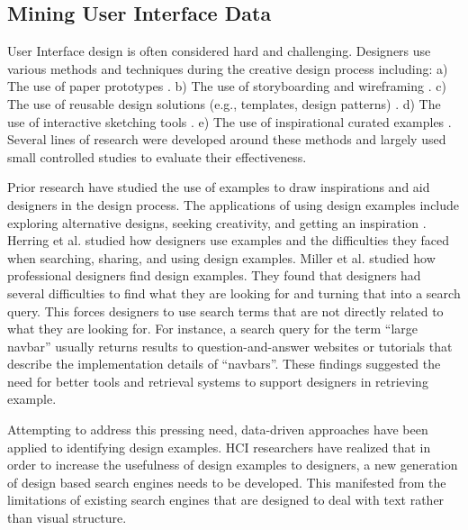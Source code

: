 \subsection{Mining User Interface Data}
User Interface design is often considered hard and challenging. Designers use various methods and techniques during the creative design process including: a) The use of paper prototypes \cite{newman_2000_DIS, klemmer_2001_UIST}. 
b) The use of storyboarding and wireframing \cite{newman_2000_DIS, wahid_2011_CHI}. 
c) The use of reusable design solutions (e.g., templates, design patterns) \cite{jacobs_2003_TOG, gibson_2005_WWW, ritchie_2011_CHI}.
d) The use of interactive sketching tools \cite{landay_1995_CHI, lin_2002_CHI, Newman_2003_HCI, sezgin_2006_GRAPH}.
e) The use of inspirational curated examples \cite{purcell_1992_KBS, herring_2009_CHI, lee_2010_CHI, ritchie_2011_CHI, miller_2014_ASME}.
Several lines of research were developed around these methods and largely used small controlled studies to evaluate their effectiveness.

Prior research have studied the use of examples to draw inspirations and aid designers in the design process.
The applications of using design examples include exploring alternative designs, seeking creativity, and getting an inspiration \cite{purcell_1992_KBS, herring_2009_CHI, lee_2010_CHI, ritchie_2011_CHI, chang_2012_CHI, miller_2014_ASME}.
Herring et al. \cite{herring_2009_CHI} studied how designers use examples and the difficulties they faced when searching, sharing, and using design examples.
Miller et al. \cite{miller_2014_ASME} studied how professional designers find design examples.
They found that designers had several difficulties to find what they are looking for and turning that into a search query.
This forces designers to use search terms that are not directly related to what they are looking for.
For instance, a search query for the term ``large navbar'' usually returns results to question-and-answer websites or tutorials that describe the implementation details of ``navbars''.
These findings suggested the need for better tools and retrieval systems to support designers in retrieving example.

Attempting to address this pressing need, data-driven approaches have been applied to identifying design examples.
HCI researchers have realized that in order to increase the usefulness of design examples to designers, a new generation of design based search engines needs to be developed.
This manifested from the limitations of existing search engines that are designed to deal with text rather than visual structure.

